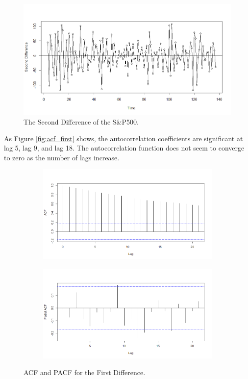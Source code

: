 \documentclass[12pt, centerh1]{article}
\begin{document}
\begin{figure}[H]
    \centering
    \includegraphics[scale=0.5]{imgs/second_difference.png}
    \caption{The Second Difference of the S\&P500.}
    \label{fig:second_difference}
\end{figure}
As Figure \ref{fig:acf_first} shows, the autocorrelation coefficients are significant at lag 5, lag 9, and lag 18. The autocorrelation function does not seem to converge to zero as the number of lags increase. 
\begin{figure}
     \centering
     \begin{subfigure}[b]{0.55\textwidth}
         \includegraphics[width=1\linewidth]{imgs/acf.png}
         \caption{}
         \label{fig:y equals x}
     \end{subfigure}
     
     \begin{subfigure}[b]{0.55\textwidth}
         \includegraphics[width=1\linewidth]{imgs/pacf.png}
         \caption{}
         \label{fig:three sin x}
     \end{subfigure}
     \caption{ACF and PACF for the First Difference.}
\end{figure}
\end{document}
